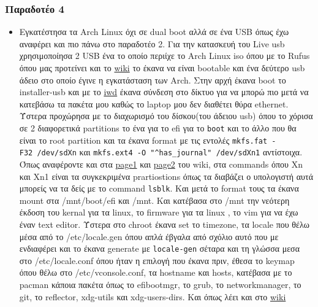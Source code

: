 \hypertarget{ux3c0ux3b1ux3c1ux3b1ux3b4ux3bfux3c4ux3adux3bf-4}{%
\subsubsection{Παραδοτέο
4}\label{ux3c0ux3b1ux3c1ux3b1ux3b4ux3bfux3c4ux3adux3bf-4}}

\begin{itemize}
\tightlist
\item
  Εγκατέστησα τα Arch Linux όχι σε dual boot αλλά σε ένα USB όπως έχω
  αναφέρει και πιο πάνω στο παραδοτέο 2. Για την κατασκευή του Live usb
  χρησιμοποίησα 2 USB ένα το οποίο περιίχε το Arch Linux iso όπου με το
  Rufus όπου μας προτείνει και το
  \href{https://wiki.archlinux.org/title/USB_flash_installation_medium\#Using_Rufus}{wiki}
  το έκανα να είναι bootable και ένα δεύτερο usb άδειο στο οποίο έγινε η
  εγκατάσταση των Arch. Στην αρχή έκανα boot το installer-usb και με το
  \href{https://wiki.archlinux.org/title/iwd}{iwd} έκανα σύνδεση στο
  δίκτυο για να μπορώ πιο μετά να κατεβάσω τα πακέτα μου καθώς το laptop
  μου δεν διαθέτει θύρα ethernet. Ύστερα προχώρησα με το διαχωρισμό του
  δίσκου(του άδειου usb) όπου το χόρισα σε 2 διαφορετικά partitions το
  ένα για το efi για το \texttt{boot} και το άλλο που θα είναι το root
  partition και τα έκανα format με τις εντολές
  \texttt{mkfs.fat\ -F32\ /dev/sdXn} και
  \texttt{mkfs.ext4\ -O\ "\^{}has\_journal"\ /dev/sdXn1} αντίστοιχα.
  Όπως αναφέροντε και στα
  \href{https://wiki.archlinux.org/title/USB_flash_installation_medium\#In_GNU/Linux_4}{page1}
  και
  \href{https://wiki.archlinux.org/title/Install_Arch_Linux_on_a_removable_medium\#Minimizing_disk_access}{page2}
  του wiki, στα commands όπου Xn και Xn1 είναι τα συγκεκριμένα
  prartiostions όπως τα διαβάζει ο υπολογιστή αυτά μπορείς να τα δείς με
  το command \texttt{lsblk}. Και μετά το format τους τα έκανα mount στα
  /mnt/boot/efi και /mnt. Και κατέβασα στο /mnt την νεότερη έκδοση του
  kernal για τα linux, το firmware για τα linux , το vim για να έχω έναν
  text editor. Ύστερα στο chroot έκανα set το timezone, τα locale που
  θέλω μέσα από το /etc/locale.gen όπου απλά έβγαλα από σχόλιο αυτό που
  με ενδιαφέρει και το έκανα generate με \texttt{locale-gen} σέταρα και
  τη γλώσσα μεσα στο /etc/locale.conf όπου ήταν η επιλογή που έκανα
  πριν, έθεσα το keymap όπου θέλω στο /etc/vconsole.conf, τα hostname
  και hosts, κατέβασα με το pacman κάποια πακέτα όπως το efibootmgr, το
  grub, το networkmanager, το git, το reflector, xdg-utils και
  xdg-users-dirs. Και όπως λέει και στο
  \href{https://wiki.archlinux.org/title/Install_Arch_Linux_on_a_removable_medium\#Installation_tweaks}{wiki}

\end{itemize}
